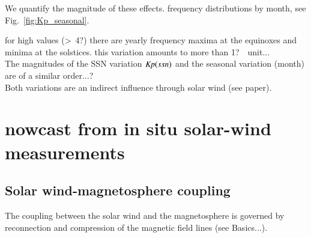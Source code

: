 We quantify the magnitude of these effects. \Kp{} frequency distributions by month, see Fig.~\ref{fig:Kp_seasonal}.\\
\begin{figure}
\end{figure}
for high \Kp{} values (>~4?) there are yearly frequency maxima at the equinoxes and minima at the solstices. this variation amounts to more than 1?~\Kp~unit...\\

The magnitudes of the SSN variation $\textit{Kp}(ssn)$ and the seasonal variation \Kp(month) are of a similar order...?\\

Both variations are an indirect influence through solar wind (see paper).\\


\section{\Kp{} nowcast from in situ solar-wind measurements}
\label{sec:kp_nowcast}

\subsection{Solar wind-magnetosphere coupling}
The coupling between the solar wind and the magnetosphere is governed by reconnection and compression of the magnetic field lines (see Basics...).\\

